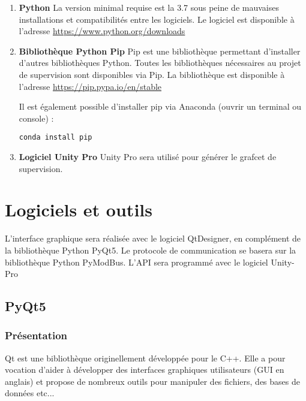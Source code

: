 \begin{enumerate}
\item \textbf{Python} \newline
La version minimal requise est la 3.7 sous peine de mauvaises installations et compatibilités entre les logiciels. \newline
Le logiciel est disponible à l'adresse \url{https://www.python.org/downloads} \newline
\item \textbf{Bibliothèque Python Pip} \newline 
Pip est une bibliothèque permettant d'installer d'autres bibliothèques Python. Toutes les bibliothèques nécessaires au projet de supervision sont disponibles via Pip. \newline
La bibliothèque est disponible à l'adresse \url{https://pip.pypa.io/en/stable} \newline

Il est également possible d'installer pip via Anaconda (ouvrir un terminal ou console) :
\begin{lstlisting}
conda install pip
\end{lstlisting}

\item \textbf{Logiciel Unity Pro} \newline 
Unity Pro sera utilisé pour générer le grafcet de supervision. \newline 
\end{enumerate}

\chapter{Logiciels et outils}


L'interface graphique sera réalisée avec le logiciel QtDesigner, en complément de la bibliothèque Python PyQt5.
Le protocole de communication se basera sur la bibliothèque Python PyModBus.
L'API sera programmé avec le logiciel Unity-Pro

\section{PyQt5}

\subsection{Présentation}

Qt est une bibliothèque originellement développée pour le C++. Elle a pour vocation d'aider à développer des interfaces graphiques utilisateurs (GUI en anglais) et propose de nombreux outils pour manipuler des fichiers, des bases de données etc...\newline

